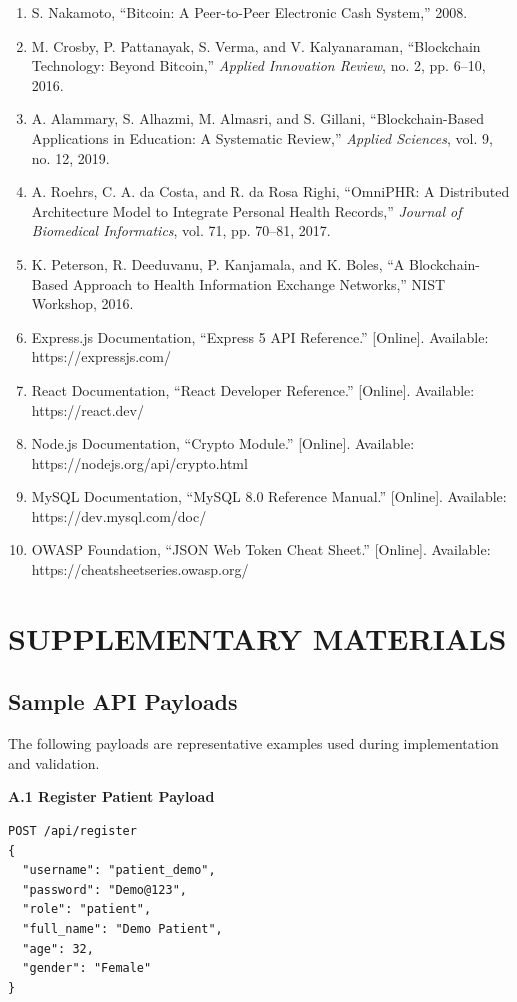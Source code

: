 \documentclass[12pt,a4paper]{report}
\begin{document}
\begin{enumerate}
\item S. Nakamoto, ``Bitcoin: A Peer-to-Peer Electronic Cash System,'' 2008.
\item M. Crosby, P. Pattanayak, S. Verma, and V. Kalyanaraman, ``Blockchain Technology: Beyond Bitcoin,'' \textit{Applied Innovation Review}, no. 2, pp. 6--10, 2016.
\item A. Alammary, S. Alhazmi, M. Almasri, and S. Gillani, ``Blockchain-Based Applications in Education: A Systematic Review,'' \textit{Applied Sciences}, vol. 9, no. 12, 2019.
\item A. Roehrs, C. A. da Costa, and R. da Rosa Righi, ``OmniPHR: A Distributed Architecture Model to Integrate Personal Health Records,'' \textit{Journal of Biomedical Informatics}, vol. 71, pp. 70--81, 2017.
\item K. Peterson, R. Deeduvanu, P. Kanjamala, and K. Boles, ``A Blockchain-Based Approach to Health Information Exchange Networks,'' NIST Workshop, 2016.
\item Express.js Documentation, ``Express 5 API Reference.'' [Online]. Available: https://expressjs.com/
\item React Documentation, ``React Developer Reference.'' [Online]. Available: https://react.dev/
\item Node.js Documentation, ``Crypto Module.'' [Online]. Available: https://nodejs.org/api/crypto.html
\item MySQL Documentation, ``MySQL 8.0 Reference Manual.'' [Online]. Available: https://dev.mysql.com/doc/
\item OWASP Foundation, ``JSON Web Token Cheat Sheet.'' [Online]. Available: https://cheatsheetseries.owasp.org/
\end{enumerate}

\appendix
\chapter{SUPPLEMENTARY MATERIALS}

\section{Sample API Payloads}

The following payloads are representative examples used during implementation and validation.

\textbf{A.1 Register Patient Payload}

\begin{verbatim}
POST /api/register
{
  "username": "patient_demo",
  "password": "Demo@123",
  "role": "patient",
  "full_name": "Demo Patient",
  "age": 32,
  "gender": "Female"
}
\end{verbatim}
\end{document}

